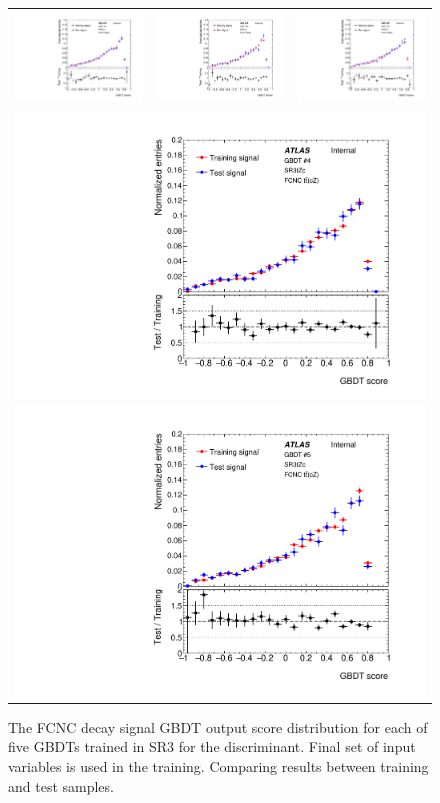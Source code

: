 \begin{figure}[!htbp]
	\centering
	\begin{tabular}{ccc}
		\includegraphics[width=.3\textwidth]{Chapters/CH5/figures/SR3_UsingSMT/BDT/GBDT_signal_Fold1} &
		\includegraphics[width=.3\textwidth]{Chapters/CH5/figures/SR3_UsingSMT/BDT/GBDT_signal_Fold2} &
		\includegraphics[width=.3\textwidth]{Chapters/CH5/figures/SR3_UsingSMT/BDT/GBDT_signal_Fold3} \\
		\multicolumn{3}{c}{
			\includegraphics[width=.3\textwidth]{Chapters/CH5/figures/SR3_UsingSMT/BDT/GBDT_signal_Fold4}
			\includegraphics[width=.3\textwidth]{Chapters/CH5/figures/SR3_UsingSMT/BDT/GBDT_signal_Fold5}} \\
	\end{tabular}
	\caption{ The FCNC \ttbar decay signal GBDT output score distribution for each of five GBDTs trained in SR3 for the \Dthree discriminant.
		Final set of input variables is used in the training.
		Comparing results between training and test samples.
	}%
	\label{app:BDT:fig:SR3:GBDTsigFinalSet}
\end{figure}

